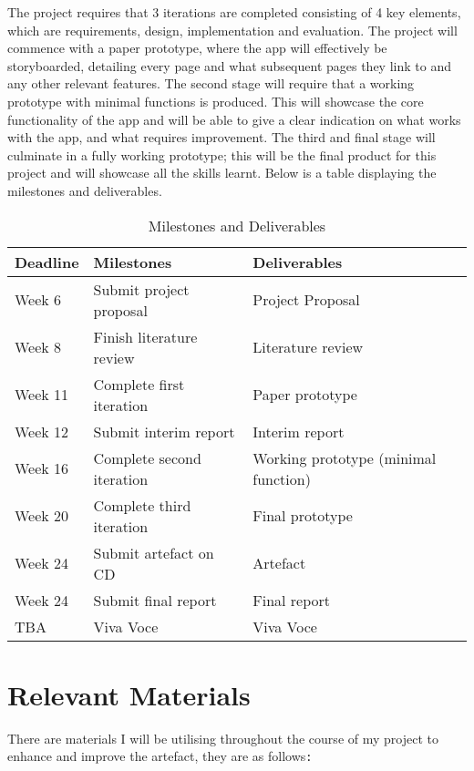 \documentclass{article}
\begin{document}
The project requires that 3 iterations are completed consisting of 4 key elements, which are requirements, design, implementation and evaluation. The project will commence with a paper prototype, where the app will effectively be storyboarded, detailing every page and what subsequent pages they link to and any other relevant features.
The second stage will require that a working prototype with minimal functions is produced. This will showcase the core functionality of the app and will be able to give a clear indication on what works with the app, and what requires improvement.
The third and final stage will culminate in a fully working prototype; this will be the final product for this project and will showcase all the skills learnt.
Below is a table displaying the milestones and deliverables.

\begin{figure}[H]
\centering
\end{figure}

\begin{table}[H]
	\centering
	\begin{tabular}{| l | l | l |}
\hline
Deadline & 	Milestones & 				Deliverables \\
\hline
Week 6   & 	Submit project proposal &		Project Proposal \\
Week 8 &		Finish literature review &		Literature review \\
Week 11 &	Complete first iteration &		Paper prototype \\
Week 12 &	Submit interim report &		Interim report \\
Week 16 &	Complete second iteration & 	Working prototype (minimal function) \\
Week 20 &	Complete third iteration &		Final prototype \\
Week 24 &	Submit artefact on CD & 		Artefact \\
Week 24 &	Submit final report &			Final report \\
TBA &  		Viva Voce &				Viva Voce \\
\hline

	\end{tabular}
\caption{Milestones and Deliverables}
\end{table}

\section{Relevant Materials}


There are materials I will be utilising throughout the course of my project to enhance and improve the artefact, they are as follows{\texttt{:}}
\end{document}
